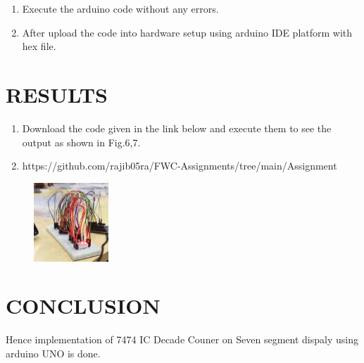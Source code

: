 \documentclass[conference]{IEEEtran}
\begin{document}
\begin{enumerate}
\item Execute the arduino code without any errors.
\item After upload the code into hardware setup using arduino IDE platform with hex file.
 \end{enumerate}

\section{RESULTS}
 \begin{enumerate}
	 \item Download the code given in the link below and execute them to see the output as shown in Fig.6,7. 
	 \item https://github.com/rajib05ra/FWC-Assignments/tree/main/Assignment%
 \end{enumerate}
 \begin{figure}[h] 
	\centering 
	\includegraphics[width=0.25\textwidth]{fig7.jpg   }
	\caption{\label{fig-6:Gates}}    
\end{figure}




\section{CONCLUSION}
Hence implementation of 7474 IC Decade Couner on Seven segment dispaly using arduino UNO is done.
\end{document}
